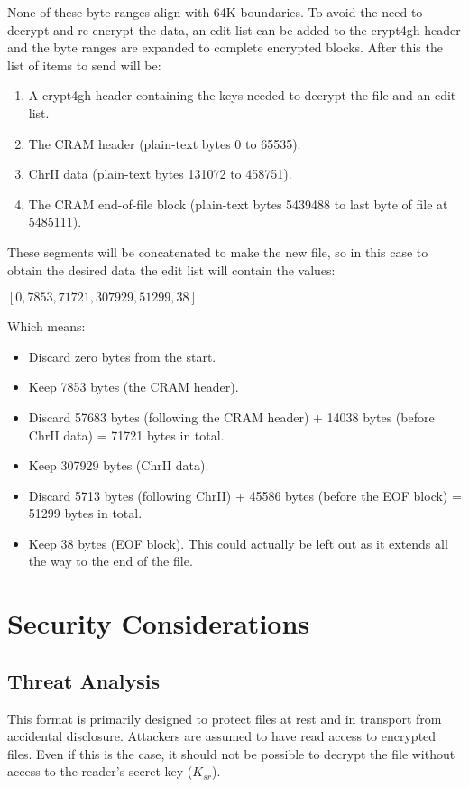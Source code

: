 \documentclass[10pt]{article}
\begin{document}
None of these byte ranges align with 64K boundaries.
To avoid the need to decrypt and re-encrypt the data,
an edit list can be added to the crypt4gh header and the byte ranges are expanded to complete encrypted blocks.
After this the list of items to send will be:

\begin{enumerate}
\item A crypt4gh header containing the keys needed to decrypt the file and an edit list.
\item The CRAM header (plain-text bytes 0 to 65535).
\item ChrII data (plain-text bytes 131072 to 458751).
\item The CRAM end-of-file block (plain-text bytes 5439488 to last byte of file at 5485111).
\end{enumerate}

These segments will be concatenated to make the new file,
so in this case to obtain the desired data the edit list will contain the values:
\begin{center}
$[0, 7853, 71721, 307929, 51299, 38]$
\end{center}

Which means:

\begin{itemize}
\item Discard zero bytes from the start.
\item Keep 7853 bytes (the CRAM header).
\item Discard 57683 bytes (following the CRAM header) + 14038 bytes (before ChrII data) = 71721 bytes in total.
\item Keep 307929 bytes (ChrII data).
\item Discard 5713 bytes (following ChrII) + 45586 bytes (before the EOF block) = 51299 bytes in total.
\item Keep 38 bytes (EOF block).
This could actually be left out as it extends all the way to the end of the file.
\end{itemize}

\section{Security Considerations}
\subsection{Threat Analysis}
This format is primarily designed to protect files at rest and in transport from accidental disclosure.
Attackers are assumed to have read access to encrypted files.
Even if this is the case,
it should not be possible to decrypt the file without access to the reader's secret key ($K_{sr}$).
\end{document}
